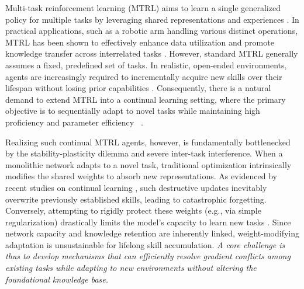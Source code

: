 \documentclass{article}
\begin{document}
Multi-task reinforcement learning (MTRL) aims to learn a single generalized policy for multiple tasks by leveraging shared representations and experiences \cite{q2, q60}. 
In practical applications, such as a robotic arm handling various distinct operations, MTRL has been shown to effectively enhance data utilization and promote knowledge transfer across interrelated tasks \cite{q7}. 
However, standard MTRL generally assumes a fixed, predefined set of tasks. In realistic, open-ended environments, agents are increasingly required to incrementally acquire new skills over their lifespan without losing prior capabilities \cite{q16,q84}. 
Consequently, there is a natural demand to extend MTRL into a continual learning setting, where the primary objective is to sequentially adapt to novel tasks while maintaining high proficiency and parameter efficiency ~\cite{q11}.

Realizing such continual MTRL agents, however, is fundamentally bottlenecked by the stability-plasticity dilemma and severe inter-task interference. 
When a monolithic network adapts to a novel task, traditional optimization intrinsically modifies the shared weights to absorb new representations. 
As evidenced by recent studies on continual learning \cite{q19,q20}, such destructive updates inevitably overwrite previously established skills, leading to catastrophic forgetting. 
Conversely, attempting to rigidly protect these weights (e.g., via simple regularization) drastically limits the model's capacity to learn new tasks \cite{q14}. 
Since network capacity and knowledge retention are inherently linked, weight-modifying adaptation is unsustainable for lifelong skill accumulation. 
\emph{A core challenge is thus to develop mechanisms that can efficiently resolve gradient conflicts among existing tasks while adapting to new environments without altering the foundational knowledge base.}
\end{document}
